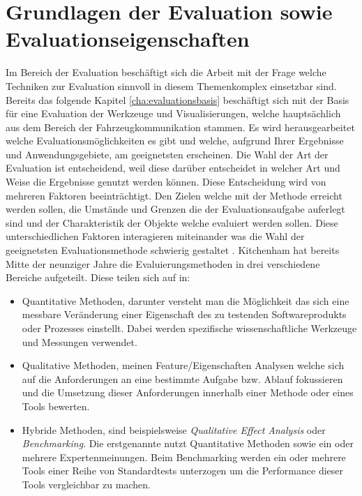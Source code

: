 \documentclass[draft=false
              ,paper=a4
              ,twoside=false
              ,fontsize=11pt
              ,headsepline
              ,BCOR10mm
              ,DIV11
              ]{scrbook}
\begin{document}
\section{Grundlagen der Evaluation sowie Evaluationseigenschaften} %
\label{sec:evaluation}
Im Bereich der Evaluation beschäftigt sich die Arbeit mit der Frage welche Techniken zur Evaluation sinnvoll in diesem Themenkomplex einsetzbar sind. Bereits das folgende Kapitel \ref{cha:evaluationsbasis} beschäftigt sich mit der Basis für eine Evaluation der Werkzeuge und Visualisierungen, welche hauptsächlich aus dem Bereich der Fahrzeugkommunikation stammen. Es wird herausgearbeitet welche Evaluationsmöglichkeiten es gibt und welche, aufgrund Ihrer Ergebnisse und Anwendungsgebiete, am geeignetsten erscheinen. Die Wahl der Art der Evaluation ist entscheidend, weil diese darüber entscheidet in welcher Art und Weise die Ergebnisse genutzt werden können. Diese Entscheidung wird von mehreren Faktoren beeinträchtigt. Den Zielen welche mit der Methode erreicht werden sollen, die Umstände und Grenzen die der Evaluationsaufgabe auferlegt sind und der Charakteristik der Objekte welche evaluiert werden sollen. Diese unterschiedlichen Faktoren interagieren miteinander was die Wahl der geeignetsten Evaluationsmethode schwierig gestaltet \cite{kitchenham_evaluating_1996-2}. Kitchenham hat bereits Mitte der neunziger Jahre die Evaluierungsmethoden in drei verschiedene Bereiche aufgeteilt. Diese teilen sich auf in:


\begin{itemize}
  \item Quantitative Methoden, darunter versteht man die Möglichkeit das sich eine messbare Veränderung einer Eigenschaft des zu testenden Softwareprodukts oder Prozesses einstellt. Dabei werden spezifische wissenschaftliche Werkzeuge und Messungen verwendet.
  \item Qualitative Methoden, meinen Feature/Eigenschaften Analysen welche sich auf die Anforderungen an eine bestimmte Aufgabe bzw. Ablauf fokussieren und die Umsetzung dieser Anforderungen innerhalb einer Methode oder eines Tools bewerten.
  \item Hybride Methoden, sind beispielsweise \textit{Qualitative Effect Analysis} oder \textit{Benchmarking}. Die erstgenannte nutzt Quantitative Methoden sowie ein oder mehrere Expertenmeinungen. Beim Benchmarking werden ein oder mehrere Tools einer Reihe von Standardtests unterzogen um die Performance dieser Tools vergleichbar zu machen.
\end{itemize}
\end{document}

